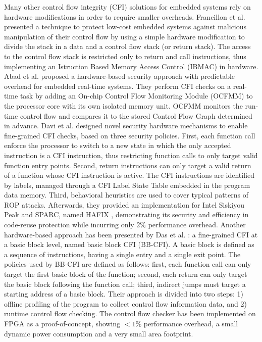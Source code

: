 Many other control flow integrity (CFI) solutions for embedded systems rely on hardware modifications in order to require smaller overheads.
Francillon et al. \cite{hardware-ibmac} presented a technique to protect low-cost embedded systems against malicious manipulation of their control flow
by using a simple hardware modification to divide the stack in a data and a control flow stack (or return stack). The access to the control flow stack is
restricted only to return and call instructions, thus implementing an Istruction Based Memory Access Control (IBMAC) in hardware.
Abad et al. \cite{ocfmm} proposed a hardware-based security approach with predictable overhead for embedded real-time systems.
They perform CFI checks on a real-time task by adding an On-chip Control Flow Monitoring Module (OCFMM) to the processor core with its own isolated memory unit.
OCFMM monitors the run-time control flow and compares it to the stored Control Flow Graph determined in advance.
Davi et al. \cite{fine-grained} designed novel security hardware mechanisms to enable fine-grained CFI checks, based on three security policies.
First, each function call enforce the processor to switch to a new state in which the only accepted instruction is a CFI instruction,
thus restricting function calls to only target valid function entry points. Second, return instructions can only target a valid return of a function whose CFI instruction is active.
The CFI instructions are identified by labels, managed through a CFI Label State Table embedded in the program data memory.
Third, behavioral heuristics are used to cover typical patterns of ROP attacks.
Afterwards, they provided an implementation for Intel Siskiyou Peak and SPARC, named HAFIX \cite{hafix},
demonstrating its security and efficiency in code-reuse protection while incurring only $2\%$ performance overhead.
Another hardware-based approach has been presented by Das et al. \cite{bb-cfi}: a fine-grained CFI at a basic block level, named basic block CFI (BB-CFI).
A basic block is defined as a sequence of instructions, having a single entry and a single exit point.
The policies used by BB-CFI are defined as follows: first, each function call can only target the first basic block of the function;
second, each return can only target the basic block following the function call; third, indirect jumps must target a starting address of a basic block.
Their approach is divided into two steps: 1) offline profiling of the program to collect control flow information data, and 2) runtime control flow checking.
The control flow checker has been implemented on FPGA as a proof-of-concept, showing $<1\%$ performance overhead, a small dynamic power consumption and a very small area footprint.

